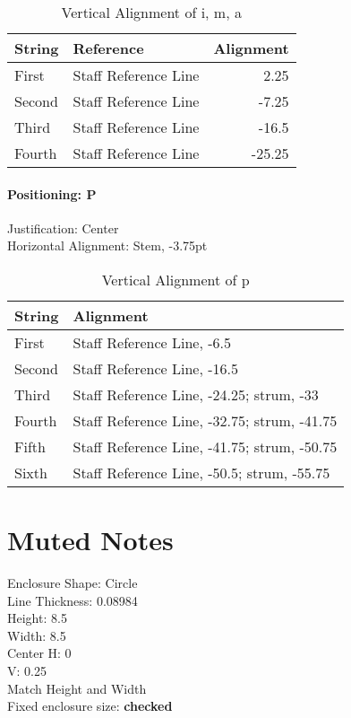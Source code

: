 \documentclass[]{memoir}
\begin{document}
\begin{table}[h!]
  \centering
  \begin{tabular}{l l r}
    String & Reference & Alignment\\\hline
    First & Staff Reference Line & 2.25\\
    Second & Staff Reference Line & -7.25\\
    Third & Staff Reference Line & -16.5\\
    Fourth & Staff Reference Line & -25.25\\
\end{tabular}
\caption{Vertical Alignment of i, m, a}
\end{table}

\paragraph{Positioning: P}
\label{sec:positioning:-p}

Justification: Center\\
Horizontal Alignment: Stem, -3.75pt\\

\begin{table}[h!]
  \centering
  \begin{tabular}{l l}
    String & Alignment\\\hline
    First & Staff Reference Line, -6.5\\
    Second & Staff Reference Line, -16.5\\
    Third & Staff Reference Line, -24.25; strum, -33\\
    Fourth & Staff Reference Line, -32.75; strum, -41.75\\
    Fifth & Staff Reference Line, -41.75; strum, -50.75\\
    Sixth & Staff Reference Line, -50.5; strum, -55.75\\
  \end{tabular}
  \caption{Vertical Alignment of p}
  \label{tab:p}
\end{table}

\section{Muted Notes}
\label{sec:muted-notes}

Enclosure Shape: Circle\\
Line Thickness: 0.08984\\
Height: 8.5\\
Width: 8.5\\
Center H: 0\\
V: 0.25\\
Match Height and Width\\
Fixed enclosure size: \textbf{checked}
\end{document}
